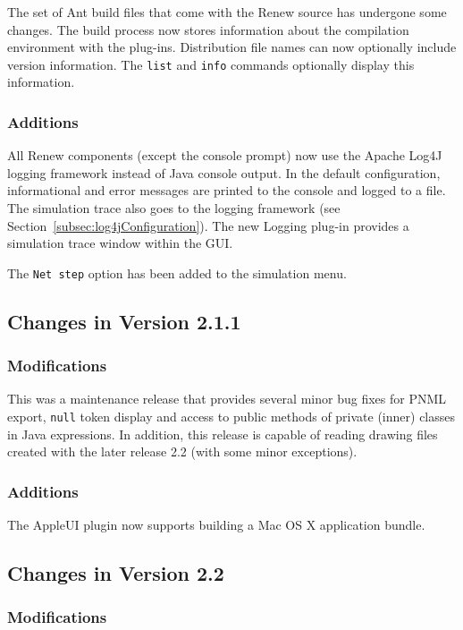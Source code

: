 The set of Ant build files that come with the Renew source has undergone
some changes.
The build process now stores information about the compilation environment
with the plug-ins.
Distribution file names can now optionally include version information.
The \texttt{list} and \texttt{info} commands optionally display this
information.

\subsubsection*{Additions}

All Renew components (except the console prompt) now use the Apache Log4J
logging framework instead of Java console output. 
In the default configuration, informational and error messages are printed
to the console and logged to a file.
The simulation trace also goes to the logging framework (see
Section~\ref{subsec:log4jConfiguration}).
The new Logging plug-in provides a simulation trace window within the GUI.

The \texttt{Net step} option has been added to the simulation menu.

\subsection{Changes in Version 2.1.1}

\subsubsection*{Modifications}

This was a maintenance release that provides several minor bug fixes for
PNML export, \texttt{null} token display and access to public methods of
private (inner) classes in Java expressions.
In addition, this release is capable of reading drawing files created with
the later release 2.2 (with some minor exceptions).

\subsubsection*{Additions}

The AppleUI plugin now supports building a Mac OS X application bundle.

\subsection{Changes in Version 2.2}

\subsubsection*{Modifications}

